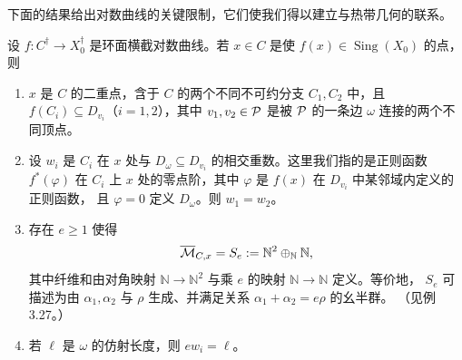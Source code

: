 下面的结果给出对数曲线的关键限制，它们使我们得以建立与热带几何的联系。

\begin{proposition}
设 $f : C^{\dagger} \to X_0^{\dagger}$ 是环面横截对数曲线。若 $x\in C$ 是使
$f(x)\in\operatorname{Sing}(X_0)$ 的点，则
\begin{enumerate}[label=(\arabic*),leftmargin=*]
\item $x$ 是 $C$ 的二重点，含于 $C$ 的两个不同不可约分支 $C_1, C_2$ 中，且
$f(C_i)\subseteq D_{v_i}$（$i=1,2$），其中 $v_1,v_2\in\mathcal{P}$ 是被 $\mathcal{P}$ 的一条边 $\omega$ 连接的两个不同顶点。
\item 设 $w_i$ 是 $C_i$ 在 $x$ 处与 $D_\omega\subseteq D_{v_i}$ 的相交重数。这里我们指的是正则函数
$f^*(\varphi)$ 在 $C_i$ 上 $x$ 处的零点阶，其中 $\varphi$ 是 $f(x)$ 在 $D_{v_i}$ 中某邻域内定义的正则函数，
且 $\varphi=0$ 定义 $D_\omega$。则 $w_1 = w_2$。
\item 存在 $e\ge1$ 使得
\[
\overline{\mathcal{M}}_{C,x} = S_e := \mathbb{N}^2\oplus_{\mathbb{N}}\mathbb{N},
\]
其中纤维和由对角映射 $\mathbb{N}\to\mathbb{N}^2$ 与乘 $e$ 的映射 $\mathbb{N}\to\mathbb{N}$ 定义。等价地，
$S_e$ 可描述为由 $\alpha_1,\alpha_2$ 与 $\rho$ 生成、并满足关系 $\alpha_1+\alpha_2 = e\rho$ 的幺半群。
（见例 3.27。）
\item 若 $\ell$ 是 $\omega$ 的仿射长度，则 $ew_i = \ell$。
\end{enumerate}
\end{proposition}

